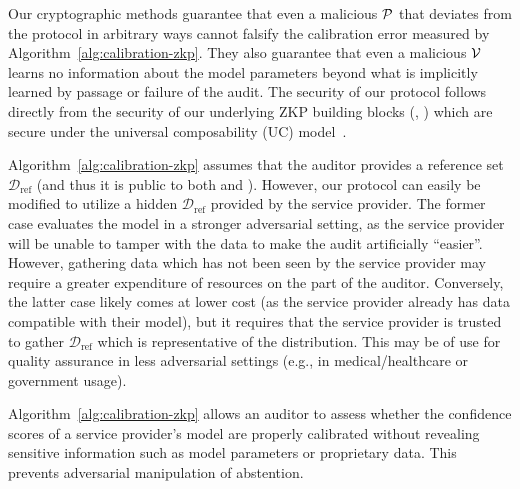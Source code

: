 Our cryptographic methods guarantee that even a malicious $\mathcal{P}$ that deviates from the protocol in arbitrary ways cannot falsify the calibration error measured by Algorithm~\ref{alg:calibration-zkp}. They also guarantee that even a malicious $\mathcal{V}$ learns no information about the model parameters beyond what is implicitly learned by passage or failure of the audit. The security of our protocol follows directly from the security of our underlying ZKP building blocks (\cite{weng2021wolverine}, \cite{franzese2021zkram}) which are secure under the universal composability (UC) model~\cite{canetti2001UC}. %

 Algorithm~\ref{alg:calibration-zkp} assumes that the auditor provides a reference set $\mathcal{D}_{\text{ref}}$ (and thus it is public to both \prover and \verifier). However, our protocol can easily be modified to utilize a hidden $\mathcal{D}_{\text{ref}}$ provided by the service provider. The former case evaluates the model in a stronger adversarial setting, as the service provider will be unable to tamper with the data to make the audit artificially ``easier''. However, gathering data which has not been seen by the service provider may require a greater expenditure of resources on the part of the auditor. Conversely, the latter case likely comes at lower cost (as the service provider already has data compatible with their model), but it requires that the service provider is trusted to gather $\mathcal{D}_{\text{ref}}$ which is representative of the distribution. This may be of use for quality assurance in less adversarial settings (e.g., in medical/healthcare or government usage).%

Algorithm~\ref{alg:calibration-zkp} allows an auditor to assess whether the confidence scores of a service provider's model are properly calibrated without revealing sensitive information such as model parameters or proprietary data. This prevents adversarial manipulation of abstention.

